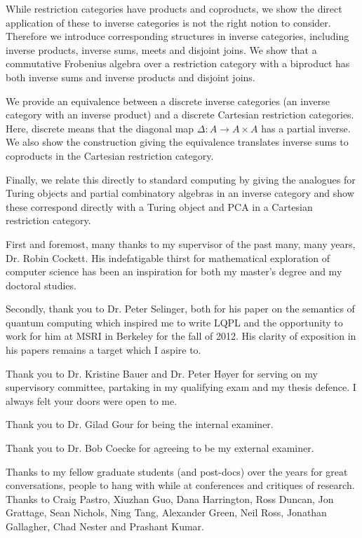\documentclass{ucalgthes1}
\begin{document}
While restriction categories have products and coproducts, we show the direct application of these
to inverse categories is not the right notion to consider. Therefore we introduce corresponding
structures in inverse categories, including inverse products, inverse sums, meets and disjoint
joins. We show that a commutative Frobenius algebra over a restriction category with a biproduct has
both inverse sums and inverse products and disjoint joins.

We provide an equivalence between a discrete inverse categories (an inverse category with an inverse
product) and a discrete Cartesian restriction categories. Here, discrete means that the diagonal map
$\Delta:A \to A\times A$ has a partial inverse. We also show the construction giving the equivalence
translates inverse sums to coproducts in the Cartesian restriction category.

Finally, we relate this directly to standard computing by giving the analogues for Turing objects
and partial combinatory algebras in an inverse category and show these correspond directly with a
Turing object and PCA in a Cartesian restriction category.


\newpage
{}
{}

First and foremost, many thanks to my supervisor of the past many, many years, Dr. Robin
Cockett. His indefatigable thirst for mathematical exploration of computer science has been an
inspiration for both my master's degree and my doctoral studies.

Secondly, thank you to Dr. Peter Selinger, both for his paper on the semantics of quantum computing
which inspired me to write LQPL and the opportunity to work for him at MSRI in Berkeley for the fall
of 2012. His clarity of exposition in his papers remains a target which I  aspire to.

Thank you to Dr. Kristine Bauer and Dr. Peter Høyer for serving on my supervisory committee,
partaking in my qualifying exam and my thesis defence. I always felt your doors were open to me.

Thank you to Dr. Gilad Gour for being the internal examiner.

Thank you to Dr. Bob Coecke for agreeing to be my external examiner.

Thanks to my fellow graduate students (and post-docs) over the years for great conversations, people
to hang with while at conferences and critiques of research. Thanks to Craig Pastro, Xiuzhan Guo,
Dana Harrington, Ross Duncan, Jon Grattage, Sean Nichols, Ning Tang, Alexander Green, Neil Ross,
Jonathan Gallagher, Chad Nester and Prashant Kumar.
\end{document}

